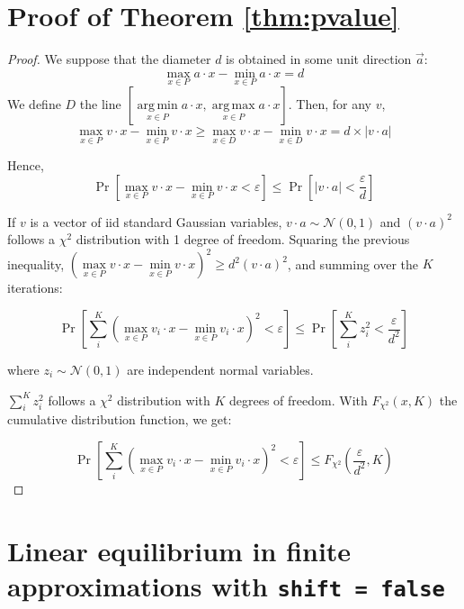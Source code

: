 \documentclass[preprint,12pt,authoryear]{elsarticle}
\theoremstyle{definition}
\DeclareMathOperator*{\argmax}{arg\,max}
\DeclareMathOperator*{\argmin}{arg\,min}
\begin{document}
\section{Proof of Theorem \ref{thm:pvalue}}
\pvalue*
\begin{proof}
    We suppose that the diameter $d$ is obtained in some unit direction $\vec a$: $$\max \limits_{x\in P}a \cdot x - \min \limits_{x\in P}a \cdot x = d$$
    We define $D$ the line $\left[\argmin \limits_{x\in P}a \cdot x, \argmax \limits_{x\in P}a \cdot x\right]$.
    Then, for any $v$, $$\max \limits_{x\in P}v \cdot x - \min \limits_{x\in P}v \cdot x \ge \max \limits_{x\in D}v \cdot x - \min \limits_{x\in D}v \cdot x = d \times |v \cdot a|$$

Hence, $$\Pr\left[ \max \limits_{x\in P}v \cdot x - \min \limits_{x\in P}v \cdot x < \varepsilon \right] \le \Pr\left[ |v \cdot a| < \frac{\varepsilon}{d} \right]$$



If $v$ is a vector of iid standard Gaussian variables, $v \cdot a \sim \mathcal{N}(0, 1)$ and $(v \cdot a)^2$ follows a $\chi^2$ distribution with 1 degree of freedom.
Squaring the previous inequality, $\left(\max \limits_{x\in P}v \cdot x - \min \limits_{x\in P}v \cdot x\right)^2 \ge d^2 (v \cdot a)^2$, and summing over the $K$ iterations:

$$\Pr\left[\sum_i^K (\max \limits_{x\in P}v_i \cdot x - \min \limits_{x\in P}v_i \cdot x)^2 < \varepsilon \right] \le \Pr\left[ \sum_i^K z_i^2 < \frac{\varepsilon}{d^2} \right]$$

where $z_i \sim \mathcal{N}(0, 1)$ are independent normal variables.

$\sum_i^K z_i^2$ follows a $\chi^2$ distribution with $K$ degrees of freedom. With $F_{\chi^2}(x, K)$ the cumulative distribution function, we get:

$$\Pr\left[\sum_i^K (\max \limits_{x\in P}v_i \cdot x - \min \limits_{x\in P}v_i \cdot x)^2 < \varepsilon \right] \le F_{\chi^2}\left(\frac{\varepsilon}{d^2}, K\right)$$
\end{proof}

\section{Linear equilibrium in finite approximations with \texttt{shift~=~false}}
\label{sec:linear-noshift}

\begin{figure}[H]
  \centering
  \begin{minipage}[t]{0.48\textwidth}
    \centering
    
  \end{minipage}
  \hfill
  \begin{minipage}[t]{0.48\textwidth}
    \centering
    
  \end{minipage}
\end{figure}







\end{document}
